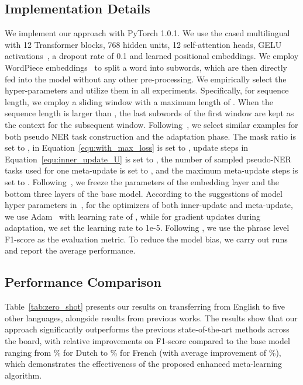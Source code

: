 \documentclass[letterpaper]{article} \usepackage{aaai20}  \usepackage{times}  \usepackage{helvet} \usepackage{courier}  \usepackage[hyphens]{url}  \usepackage{graphicx} \urlstyle{rm} \def\UrlFont{\rm}  \usepackage{graphicx}
\begin{document}
 \subsection{Implementation Details}
We implement our approach with PyTorch 1.0.1.
We use the cased multilingual  with 12 Transformer blocks, 768 hidden units, 12 self-attention heads, GELU activations~\cite{dan2016bridging}, a dropout rate of 0.1 and learned positional embeddings. We employ WordPiece embeddings~\cite{wu2016google} to split a word into subwords, which are then directly fed into the model without any other pre-processing. 
We empirically select the hyper-parameters and utilize them in all experiments.
Specifically, for sequence length, we employ a sliding window with a maximum length of .
When the sequence length is larger than , the last  subwords of the first window are kept as the context for the subsequent window. 
Following~\cite{huang2018natural}, we select  similar examples for both pseudo NER task construction and the adaptation phase.
The mask ratio is set to ,  in Equation~\ref{equ:with_max_loss} is set to , update steps  in Equation~\ref{equ:inner_update_U} is set to , the number of sampled pseudo-NER tasks used for one meta-update is set to , and the maximum meta-update steps is set to . 
Following~\cite{wu2019beto}, we freeze the parameters of the embedding layer and the bottom three layers of the base model. 
According to the suggestions of model hyper parameters in~\cite{devlin2019bert}, for the optimizers of both inner-update and meta-update, we use Adam~\cite{kingma2014adam} with learning rate of , while for gradient updates during adaptation, we set the learning rate  to 1e-5. 
Following \cite{tjong2002introduction}, we use the phrase level F1-score as the evaluation metric. 
To reduce the model bias, we carry out  runs and report the average performance. 



\subsection{Performance Comparison}
Table~\ref{tab:zero_shot} presents our results on transferring from English to five other languages, alongside results from previous works. 
The results show that our approach significantly outperforms the previous state-of-the-art methods across the board, with relative improvements on F1-score compared to the base model ranging from \% for Dutch to \% for French (with average improvement of \%), which demonstrates the effectiveness of the proposed enhanced meta-learning algorithm. 
\end{document}
